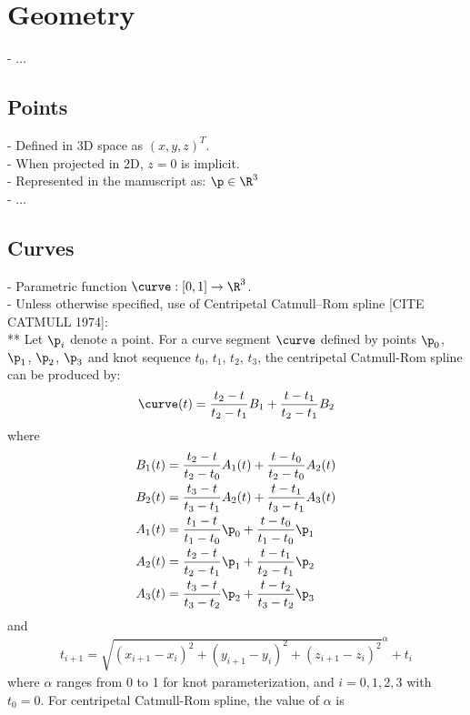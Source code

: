 \chapter{Geometry}
- ...

\section{Points}
- Defined in 3D space as $\left( x, y, z \right)^T$. \\
- When projected in 2D, $z = 0$ is implicit. \\
- Represented in the manuscript as: $\p \in \R^3$ \\
- ...

\section{Curves}
- Parametric function $\curve: [0, 1] \to \R^3$. \\
- Unless otherwise specified, use of Centripetal Catmull–Rom spline [CITE CATMULL 1974]: \\
** Let $\p_i$ denote a point. For a curve segment $\curve$ defined by points $\p_0$, $\p_1$, $\p_2$, $\p_3$ and knot sequence $t_0$, $t_1$, $t_2$, $t_3$, the centripetal Catmull-Rom spline can be produced by:
\begin{align}
    \curve(t) = \frac{t_2 - t}{t_2 - t_1} B_1 + \frac{t - t_1}{t_2 - t_1} B_2
\end{align}
where
\begin{align}
    B_1(t) &= \frac {t_2 - t}{t_2 - t_0} A_1(t) + \frac{t - t_0}{t_2 - t_0} A_2(t) \\
    B_2(t) &= \frac{t_3 - t}{t_3 - t_1} A_2(t) + \frac{t - t_1}{t_3 - t_1} A_3(t) \\
    A_1(t) &= \frac{t_1 - t}{t_1 - t_0} \p_0 + \frac{t - t_0}{t_1 - t_0} \p_1 \\
    A_2(t) &= \frac{t_2 - t}{t_2 - t_1} \p_1 + \frac{t - t_1}{t_2 - t_1} \p_2 \\
    A_3(t) &= \frac{t_3 - t}{t_3 - t_2} \p_2 + \frac{t - t_2}{t_3 - t_2} \p_3
\end{align}
and
\begin{align}
    t_{i + 1} = \sqrt{ \left(x_{i+1} - x_i \right)^2 + \left(y_{i+1} - y_i \right)^2 +  \left(z_{i+1} - z_i \right)^2 }^\alpha + t_i
\end{align}
where $\alpha$ ranges from 0 to 1 for knot parameterization, and $i = 0, 1, 2, 3$ with $t_0 = 0$. For centripetal Catmull-Rom spline, the value of $\alpha$ is 
